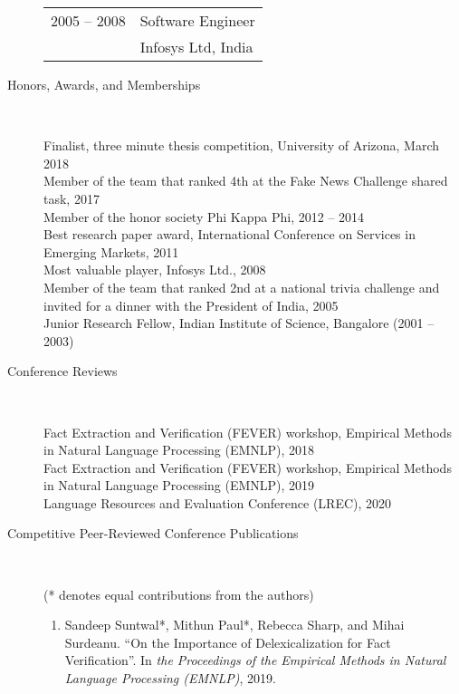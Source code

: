 \documentclass[10pt]{article}
\newcommand{\ve}[1]{{\em #1}} %
\newcommand{\ti}[1]{``#1''} %
\begin{document}
\begin{description}
\begin{tabular}{lp{4.9in}}
\hspace{-.2cm}2005 -- 2008 & Software Engineer	\\
& {\sc Infosys Ltd, India} 

\end{tabular}

\vspace{-.3cm}
\item [Honors, Awards, and Memberships]\

Finalist, three minute thesis competition, University of Arizona, March 2018\\
Member of the team that ranked 4th at the Fake News Challenge shared task, 2017\\
Member of the honor society Phi Kappa Phi, 2012 -- 2014\\
Best research paper award, International Conference on Services in Emerging Markets, 2011\\
Most valuable player,  Infosys  Ltd., 2008\\
Member of the team that ranked 2nd at a national trivia challenge and invited for a dinner with the President of India, 2005\\
Junior Research Fellow, Indian Institute of Science, Bangalore (2001 – 2003)\\




\vspace{-.4cm}\item [Conference Reviews]\ 

Fact Extraction and Verification (FEVER) workshop, Empirical Methods in Natural Language Processing (EMNLP), 2018\\
Fact Extraction and Verification (FEVER) workshop, Empirical Methods in Natural Language Processing (EMNLP), 2019\\
Language Resources and Evaluation Conference (LREC), 2020\\







\item [Competitive Peer-Reviewed Conference Publications]\


(* denotes equal contributions from the authors)

\begin{enumerate}

\item Sandeep Suntwal*, Mithun Paul*, Rebecca Sharp, and Mihai Surdeanu.   \ti{On the Importance of Delexicalization for Fact Verification}. In \ve{ the Proceedings of the Empirical Methods in Natural Language Processing (EMNLP)}, 2019.


\end{enumerate}
\end{description}
\end{document}
